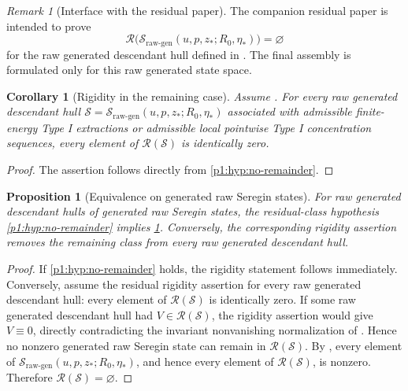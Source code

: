 \documentclass[11pt]{amsart}
\theoremstyle{plain}
\newtheorem{proposition}[proposition]{Proposition}
\newtheorem{corollary}[corollary]{Corollary}
\theoremstyle{definition}
\theoremstyle{remark}
\newtheorem{remark}[remark]{Remark}
\numberwithin{equation}{section}
\newcommand{\calS}{\mathcal S}
\newcommand{\calR}{\mathcal R}
\begin{document}
\begin{remark}[Interface with the residual paper]
\label{p1:rem:paper-IV-interface}
The companion residual paper is intended to prove
\[
   \calR\bigl(\calS_{\mathrm{raw\text{-}gen}}(u,p,z_*;R_0,\eta_*)\bigr)=\varnothing
\]
for the raw generated descendant hull defined in
.  The final assembly is formulated
only for this raw generated state space.
\end{remark}

\begin{corollary}[Rigidity in the remaining case]\label{p1:cor:remainder-rigidity}
Assume .
For every raw generated descendant hull
\(\calS=\calS_{\mathrm{raw\text{-}gen}}(u,p,z_*;R_0,\eta_*)\) associated with admissible
finite-energy Type I extractions or admissible local pointwise Type I
concentration sequences, every
element of \(\calR(\calS)\) is
identically zero.
\end{corollary}

\begin{proof}
The assertion follows directly from \cref{p1:hyp:no-remainder}.
\end{proof}

\begin{proposition}[Equivalence on generated raw Seregin states]
\label{p1:prop:remainder-equivalence}
For raw generated descendant hulls of generated raw Seregin states, the
residual-class hypothesis \cref{p1:hyp:no-remainder} implies
\cref{p1:cor:remainder-rigidity}.  Conversely, the corresponding rigidity
assertion removes the remaining class from every raw generated descendant hull.
\end{proposition}

\begin{proof}
If \cref{p1:hyp:no-remainder} holds, the rigidity statement follows immediately.
Conversely, assume the residual rigidity assertion for every raw generated
descendant hull: every element of \(\calR(\calS)\) is identically
zero.  If some raw generated descendant hull had \(V\in\calR(\calS)\),
the rigidity assertion would give \(V\equiv0\), directly contradicting the
invariant nonvanishing normalization of .  Hence no
nonzero generated raw Seregin state can remain in \(\calR(\calS)\).
By , every element of
\(\calS_{\mathrm{raw\text{-}gen}}(u,p,z_*;R_0,\eta_*)\), and hence every element of
\(\calR(\calS)\), is nonzero.  Therefore \(\calR(\calS)=\varnothing\).
\end{proof}
\end{document}
